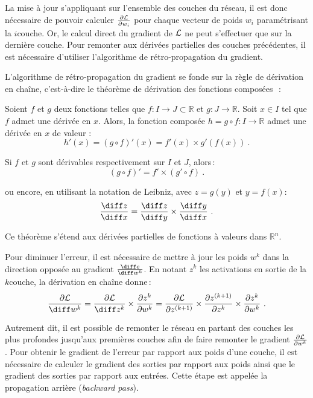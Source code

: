 La mise à jour s'appliquant sur l'ensemble des couches du réseau, il est donc nécessaire de pouvoir calculer $\frac{\partial \mathcal{L}}{\partial w_i}$ pour chaque vecteur de poids $w_i$ paramétrisant la $i$\ieme couche. Or, le calcul direct du gradient de $\mathcal{L}$ ne peut s'effectuer que sur la dernière couche. Pour remonter aux dérivées partielles des couches précédentes, il est nécessaire d'utiliser l'algorithme de rétro-propagation du gradient.

L'algorithme de rétro-propagation du gradient se fonde sur la règle de dérivation en chaîne, c'est-à-dire le théorème de dérivation des fonctions composées~\cite{de_lhopital_analyse_1716,lagrange_theorie_1797}\,:
\begin{theorem}
Soient $f$ et $g$ deux fonctions telles que $f : I \rightarrow J \subset \mathbb{R}$ et $g : J \rightarrow \mathbb{R}$. Soit $x \in I$ tel que $f$ admet une dérivée en $x$. Alors, la fonction composée $h = g \circ f : I \rightarrow \mathbb{R}$ admet une dérivée en $x$ de valeur :
$$h'(x) = (g \circ f)'(x) = f'(x) \times g'(f(x))~.$$

Si $f$ et $g$ sont dérivables respectivement sur $I$ et $J$, alors\,:
$$(g \circ f)' = f' \times (g' \circ f)~.$$

ou encore, en utilisant la notation de Leibniz, avec $z = g(y)$ et $y = f(x)$:
$$\frac{\diff z}{\diff x} = \frac{\diff z}{\diff y} \times \frac{\diff y}{\diff x}~.$$
\end{theorem}

Ce théorème s'étend aux dérivées partielles de fonctions à valeurs dans $\mathbb{R}^n$.

Pour diminuer l'erreur, il est nécessaire de mettre à jour les poids $w^k$ dans la direction opposée au gradient $\frac{\diff e}{\diff w^k}$. En notant $z^k$ les activations en sortie de la $k$\ieme couche, la dérivation en chaîne donne\,:
$$\frac{\partial \L}{\diff w^k} = \frac{\partial \L}{\diff z^k} \times \frac{\partial z^k}{\partial w^k} = \frac{\partial \L}{\partial z^{(k+1)}} \times \frac{\partial z^{(k+1)}}{\partial z^k} \times \frac{\partial z^k}{\partial w^k}~.$$

Autrement dit, il est possible de remonter le réseau en partant des couches les plus profondes jusqu'aux premières couches afin de faire remonter le gradient $\frac{\partial \mathcal{L}}{\partial w^k}$. Pour obtenir le gradient de l'erreur par rapport aux poids d'une couche, il est nécessaire de calculer le gradient des sorties par rapport aux poids ainsi que le gradient des sorties par rapport aux entrées. Cette étape est appelée la propagation arrière (\emph{backward pass}).

